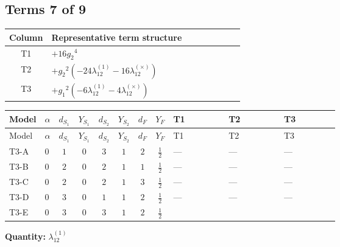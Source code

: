 \documentclass[8pt]{article}
\begin{document}
\begin{landscape}
\subsection*{Terms 7 of 9}
\begin{center}
\begin{tabular}{@{}c >{\raggedright\arraybackslash}p{0.82\linewidth}@{}}
\toprule
Column & Representative term structure \\
\midrule
T1 & \(\displaystyle +16 {g_2}^4\) \\
\midrule
T2 & \(\displaystyle +{g_2}^2 (-24 {\lambda_{12}^{(1)}}-16 {\lambda_{12}^{(\times)}})\) \\
\midrule
T3 & \(\displaystyle +{g_1}^2 (-6 {\lambda_{12}^{(1)}}-4 {\lambda_{12}^{(\times)}})\) \\
\midrule
\bottomrule
\end{tabular}
\end{center}
\smallskip
\tiny
\begin{longtable}{@{}llcccccc >{\raggedright\arraybackslash}p{0.21\linewidth} >{\raggedright\arraybackslash}p{0.21\linewidth} >{\raggedright\arraybackslash}p{0.21\linewidth}@{}}
\toprule
Model & $\alpha$ & $d_{S_1}$ & $Y_{S_1}$ & $d_{S_2}$ & $Y_{S_2}$ & $d_F$ & $Y_F$ & T1 & T2 & T3 \\
\midrule
\endfirsthead
\toprule
Model & $\alpha$ & $d_{S_1}$ & $Y_{S_1}$ & $d_{S_2}$ & $Y_{S_2}$ & $d_F$ & $Y_F$ & T1 & T2 & T3 \\
\midrule
\endhead
T3-A & $0$ & $1$ & $0$ & $3$ & $1$ & $2$ & $\frac{1}{2}$ & --- & --- & --- \\
\midrule
T3-B & $0$ & $2$ & $0$ & $2$ & $1$ & $1$ & $\frac{1}{2}$ & --- & --- & --- \\
\midrule
T3-C & $0$ & $2$ & $0$ & $2$ & $1$ & $3$ & $\frac{1}{2}$ & --- & --- & --- \\
\midrule
T3-D & $0$ & $3$ & $0$ & $1$ & $1$ & $2$ & $\frac{1}{2}$ & --- & --- & --- \\
\midrule
T3-E & $0$ & $3$ & $0$ & $3$ & $1$ & $2$ & $\frac{1}{2}$ & \scriptsize\adjustbox{max width=\linewidth}{$\begin{gathered} +16 {g_2}^4\end{gathered}$} & \scriptsize\adjustbox{max width=\linewidth}{$\begin{gathered} +{g_2}^2 (-24 {\lambda_{12}^{(1)}}-16 {\lambda_{12}^{(\times)}})\end{gathered}$} & \scriptsize\adjustbox{max width=\linewidth}{$\begin{gathered} +{g_1}^2 (-6 {\lambda_{12}^{(1)}}-4 {\lambda_{12}^{(\times)}})\end{gathered}$} \\
\midrule
\bottomrule
\end{longtable}
\clearpage
\noindent\textbf{Quantity: }$\lambda_{12}^{(1)}$\par\smallskip

\end{landscape}
\end{document}
